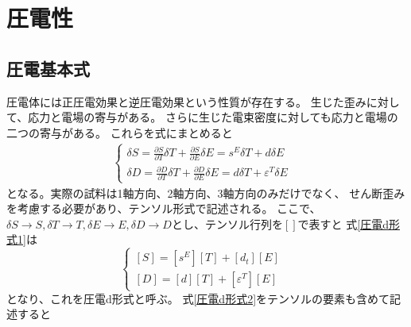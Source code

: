 \documentclass[dvipdfmx,12pt,a4paper]{jreport}
\begin{document}
		\section{圧電性}
		\subsection{圧電基本式}
		圧電体には正圧電効果と逆圧電効果という性質が存在する。
		生じた歪みに対して、応力と電場の寄与がある。
		さらに生じた電束密度に対しても応力と電場の二つの寄与がある。
		これらを式にまとめると
				\begin{eqnarray}
					\begin{cases}
						\delta S=\frac{\partial S}{\partial T}\delta T + \frac{\partial S}{\partial E} \delta E 
						= s^{E}\delta T+d \delta E & \\
						\delta D=\frac{\partial D}{\partial T}\delta T + \frac{\partial D}{\partial E}\delta E 
						= d \delta T+\varepsilon^T \delta E  &
					\end{cases}
					\label{圧電d形式1}
				\end{eqnarray}
			となる。実際の試料は1軸方向、2軸方向、3軸方向のみだけでなく、
			せん断歪みを考慮する必要があり、テンソル形式で記述される。
			ここで、$\delta S\rightarrow S, \delta T\rightarrow T,
			\delta E\rightarrow E, \delta D\rightarrow D$とし、テンソル行列を$\left[　\right]$で表すと
			式\ref{圧電d形式1}は
			\begin{equation}
				\begin{cases}
					\left[S\right]=\left[s^E\right]\left[T\right]+\left[d_t\right]\left[E\right]& \\
					\left[D\right]=\left[d\right]\left[T\right]+\left[\varepsilon^T\right]\left[E\right]
				\end{cases}
				\label{圧電d形式2}
			\end{equation}
			となり、これを圧電d形式と呼ぶ。
			式\ref{圧電d形式2}をテンソルの要素も含めて記述すると
\end{document}

